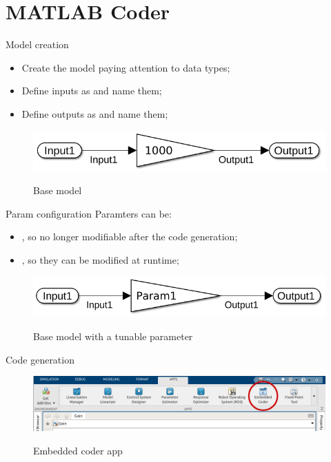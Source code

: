 
\section{MATLAB Coder}
\graphicspath{{figs/section5/}}

\begin{frame}{Model creation}
	\begin{itemize}
		\item Create the model paying attention to data types;
		\item Define inputs as  and name them;
		\item Define outputs as  and name them;
	\end{itemize}
	\vspace{0.5cm}
	\begin{figure}
		\centering
		\includegraphics[scale=0.4]{Model.png}
		\label{fig:model}
		\caption{Base model}
	\end{figure}
\end{frame}

\begin{frame}{Param configuration}
	Paramters can be:
	\begin{itemize}
		\item {}, so no longer modifiable after the code generation;
		\item {}, so they can be modified at runtime;
	\end{itemize}
	\vspace{0.5cm}
	\begin{figure}
		\centering
		\includegraphics[scale=0.4]{ModelParam.png}
		\label{fig:model_param}
		\caption{Base model with a tunable parameter}
	\end{figure}
\end{frame}

\begin{frame}{Code generation}
	\begin{figure}
		\centering
		\includegraphics[width=\textwidth]{Embedded.png}
		\label{fig:embedded}
		\caption{Embedded coder app}
	\end{figure}
\end{frame}

